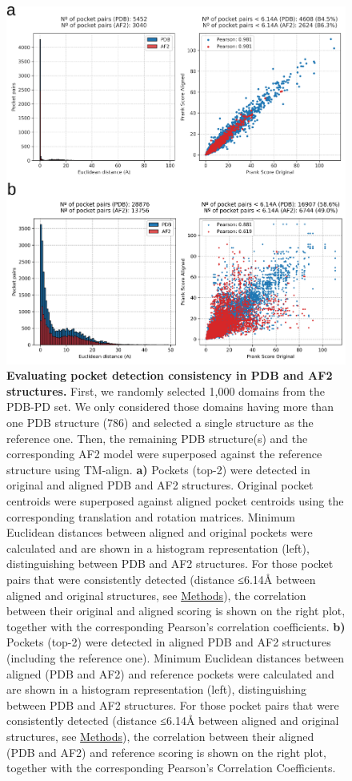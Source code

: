 \begin{figure}[htbp]
  \centering
  \includegraphics[width=0.7\linewidth]{figures/PocketVec/Supplementary/FigS17.png} 
  \caption{
    \textbf{Evaluating pocket detection consistency in PDB and AF2 structures.}
    First, we randomly selected 1,000 domains from the PDB-PD set. We only considered those domains having more than one PDB structure (786) and selected a single structure as the reference one.  Then, the remaining PDB structure(s) and the corresponding AF2 model were superposed against the reference structure using TM-align\cite{zhang_tm-align_2005}.
    \textbf{a)} Pockets (top-2) were detected in original and aligned PDB and AF2 structures. Original pocket centroids were superposed against aligned pocket centroids using the corresponding translation and rotation matrices. Minimum Euclidean distances between aligned and original pockets were calculated and are shown in a histogram representation (left), distinguishing between PDB and AF2 structures. For those pocket pairs that were consistently detected (distance ≤6.14Å between aligned and original structures, see \hyperref[PocketVec_Methods]{Methods}), the correlation between their original and aligned scoring is shown on the right plot, together with the corresponding Pearson’s correlation coefficients.
    \textbf{b)} Pockets (top-2) were detected in aligned PDB and AF2 structures (including the reference one). Minimum Euclidean distances between aligned (PDB and AF2) and reference pockets were calculated and are shown in a histogram representation (left), distinguishing between PDB and AF2 structures. For those pocket pairs that were consistently detected (distance ≤6.14Å between aligned and original structures, see \hyperref[PocketVec_Methods]{Methods}), the correlation between their aligned (PDB and AF2) and reference scoring is shown on the right plot, together with the corresponding Pearson’s Correlation Coefficients.
  }
  \label{PocketVec_FigS17}
\end{figure}




